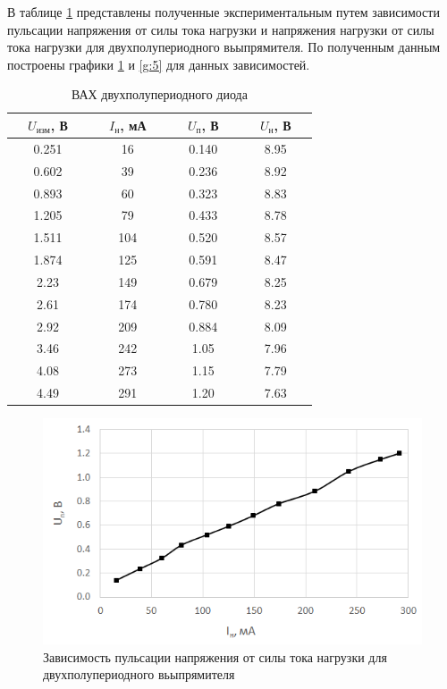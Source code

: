 В таблице \ref{tab:5:3} представлены полученные экспериментальным путем зависимости пульсации напряжения от силы тока нагрузки и напряжения нагрузки от силы тока нагрузки для двухполупериодного вьыпрямителя. По полученным данным построены графики \ref{g:4} и \ref{g:5} для данных зависимостей.

\begin{table}[H]
	\begin{center}
	\caption{ВАХ двухполупериодного диода}
	\def\arraystretch{1.5}
		\begin{tabular}{|c|c|c|c|}
		\hline 
		\ \ $U_\text{изм}$, В\ \  & \ \ $I_\text{н}$, мА\ \  & \ \ $U_\text{п}$, В\ \  & \ \ $U_\text{н}$, В\ \  \\ \hline
		0.251 & 16 & 0.140 & 8.95 \\ \hline
		0.602 & 39 & 0.236 & 8.92 \\ \hline
		0.893 & 60 & 0.323 & 8.83 \\ \hline
		1.205 & 79 & 0.433 & 8.78 \\ \hline
		1.511 & 104 & 0.520 & 8.57 \\ \hline
		1.874 & 125 & 0.591 & 8.47 \\ \hline
		2.23 & 149 & 0.679 & 8.25 \\ \hline
		2.61 & 174 & 0.780 & 8.23 \\ \hline
		2.92 & 209 & 0.884 & 8.09 \\ \hline
		3.46 & 242 & 1.05 & 7.96 \\ \hline
		4.08 & 273 & 1.15 & 7.79 \\ \hline
		4.49 & 291 & 1.20 & 7.63 \\ \hline
		\end{tabular} 
		\label{tab:5:3}
	\end{center}
\end{table}

\begin{figure}[H]
	\begin{center}
		\includegraphics[width=15cm]{img/4}
		\caption{Зависимость пульсации напряжения от силы тока нагрузки для двухполупериодного вьыпрямителя}
		\label{g:4} %
	\end{center}
\end{figure}

